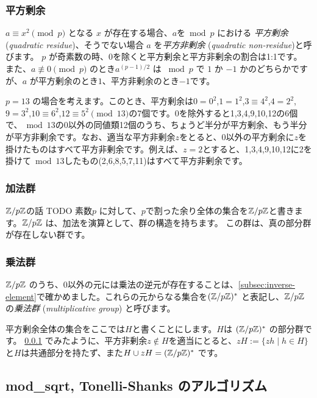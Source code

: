 \documentclass{jsarticle}
\begin{document}
   \subsubsection{平方剰余}
   \label{subsubsec:quadratic-residue}
   $a \equiv x^2 \pmod p$ となる $x$ が存在する場合、$a$を${}\bmod p$ における \emph{平方剰余} (\emph{quadratic residue})、そうでない場合 $a$ を\emph{平方非剰余} (\emph{quadratic non-residue})と呼びます。
   $p$ が奇素数の時、0を除くと平方剰余と平方非剰余の割合は1:1です。
   また、$a\not\equiv 0 \pmod p$ のとき$a^{(p-1)/2}$ は ${}\bmod p$ で $1$ か $-1$ かのどちらかですが、$a$ が平方剰余のとき$1$、平方非剰余のとき$-1$です。
   \begin{example}
    $p = 13$ の場合を考えます。このとき、平方剰余は$0=0^2$,$1=1^2$,$3\equiv 4^2$,$4=2^2$,$9=3^2$,$10\equiv 6^2$,$12 \equiv 5^2 \pmod{13}$の7個です。0を除外すると1,3,4,9,10,12の6個で、${}\bmod 13$の0以外の同値類12個のうち、ちょうど半分が平方剰余、もう半分が平方非剰余です。なお、適当な平方非剰余$z$をとると、0以外の平方剰余に$z$を掛けたものはすべて平方非剰余です。例えば、$z=2$とすると、1,3,4,9,10,12に2を掛けて${}\bmod 13$したもの(2,6,8,5,7,11)はすべて平方非剰余です。
   \end{example}
   \subsubsection{加法群}
   $\mathbb{Z}/p\mathbb{Z}$の話 TODO
   素数$p$ に対して、$p$で割った余り全体の集合を$\mathbb{Z}/p\mathbb{Z}$と書きます。$\mathbb{Z}/p\mathbb{Z}$ は、加法を演算として、群の構造を持ちます。
   この群は、真の部分群が存在しない群です。
   \subsubsection{乗法群}
   $\mathbb{Z}/p\mathbb{Z}$ のうち、0以外の元には乗法の逆元が存在することは、\ref{subsec:inverse-element}で確かめました。これらの元からなる集合を$(\mathbb{Z}/p\mathbb{Z})^*$ と表記し、$\mathbb{Z}/p\mathbb{Z}$の\emph{乗法群}  (\emph{multiplicative group}) と呼びます。

   平方剰余全体の集合をここでは$H$と書くことにします。$H$は $(\mathbb{Z}/p\mathbb{Z})^*$ の部分群です。
   \ref{subsubsec:quadratic-residue} でみたように、平方非剰余$z \not \in H$を適当にとると、$zH := \{zh \mid h \in H\}$と$H$は共通部分を持たず、また$H \cup zH = (\mathbb{Z}/p\mathbb{Z})^*$ です。
  \subsection{mod\_sqrt, Tonelli-Shanks のアルゴリズム}
  \label{subsec:tonelli-shanks}
\end{document}
